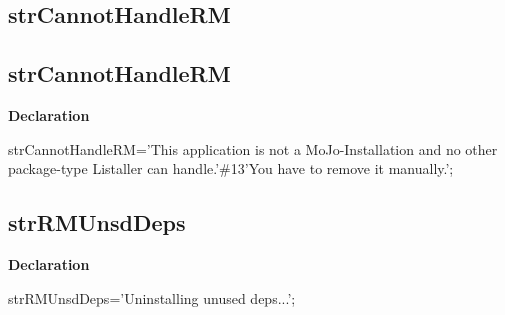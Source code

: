 \documentclass{report}
\newif\ifpdf
\begin{document}
\subsection*{\large{\textbf{strCannotHandleRM}}\normalsize\hspace{1ex}\hrulefill}
\else
\subsection*{strCannotHandleRM}
\fi
\label{trstrings-strCannotHandleRM}
\begin{list}{}{
\setlength{\itemindent}{0cm}
\setlength{\listparindent}{0cm}
\setlength{\leftmargin}{\evensidemargin}
\addtolength{\leftmargin}{\tmplength}
\settowidth{\labelsep}{X}
\addtolength{\leftmargin}{\labelsep}
\setlength{\labelwidth}{\tmplength}
}
\item[\textbf{Declaration}\hfill]
\ifpdf
\begin{flushleft}
\fi
\begin{ttfamily}
strCannotHandleRM='This application is not a MoJo-Installation and no other package-type Listaller can handle.'{\#}13'You have to remove it manually.';\end{ttfamily}

\ifpdf
\end{flushleft}
\fi

\end{list}
\ifpdf
\subsection*{\large{\textbf{strRMUnsdDeps}}\normalsize\hspace{1ex}\hrulefill}
\else
\subsection*{strRMUnsdDeps}
\fi
\label{trstrings-strRMUnsdDeps}
\begin{list}{}{
\setlength{\itemindent}{0cm}
\setlength{\listparindent}{0cm}
\setlength{\leftmargin}{\evensidemargin}
\addtolength{\leftmargin}{\tmplength}
\settowidth{\labelsep}{X}
\addtolength{\leftmargin}{\labelsep}
\setlength{\labelwidth}{\tmplength}
}
\item[\textbf{Declaration}\hfill]
\ifpdf
\begin{flushleft}
\fi
\begin{ttfamily}
strRMUnsdDeps='Uninstalling unused deps...';\end{ttfamily}

\ifpdf
\end{flushleft}
\fi

\end{list}
\ifpdf
\end{document}
